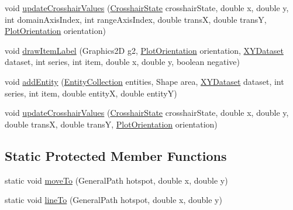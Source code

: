 \begin{DoxyCompactItemize}
void \mbox{\hyperlink{classorg_1_1jfree_1_1chart_1_1renderer_1_1xy_1_1_abstract_x_y_item_renderer_a65b65e46dadf26a12f00a7f634939ac9}{update\+Crosshair\+Values}} (\mbox{\hyperlink{classorg_1_1jfree_1_1chart_1_1plot_1_1_crosshair_state}{Crosshair\+State}} crosshair\+State, double x, double y, int domain\+Axis\+Index, int range\+Axis\+Index, double transX, double transY, \mbox{\hyperlink{classorg_1_1jfree_1_1chart_1_1plot_1_1_plot_orientation}{Plot\+Orientation}} orientation)
\item 
void \mbox{\hyperlink{classorg_1_1jfree_1_1chart_1_1renderer_1_1xy_1_1_abstract_x_y_item_renderer_a2c2307739d90675817597c71fdb2ef18}{draw\+Item\+Label}} (Graphics2D g2, \mbox{\hyperlink{classorg_1_1jfree_1_1chart_1_1plot_1_1_plot_orientation}{Plot\+Orientation}} orientation, \mbox{\hyperlink{interfaceorg_1_1jfree_1_1data_1_1xy_1_1_x_y_dataset}{X\+Y\+Dataset}} dataset, int series, int item, double x, double y, boolean negative)
\item 
void \mbox{\hyperlink{classorg_1_1jfree_1_1chart_1_1renderer_1_1xy_1_1_abstract_x_y_item_renderer_af2722e6d994c29c591b02b8400533e14}{add\+Entity}} (\mbox{\hyperlink{interfaceorg_1_1jfree_1_1chart_1_1entity_1_1_entity_collection}{Entity\+Collection}} entities, Shape area, \mbox{\hyperlink{interfaceorg_1_1jfree_1_1data_1_1xy_1_1_x_y_dataset}{X\+Y\+Dataset}} dataset, int series, int item, double entityX, double entityY)
\item 
void \mbox{\hyperlink{classorg_1_1jfree_1_1chart_1_1renderer_1_1xy_1_1_abstract_x_y_item_renderer_afbf70936cecbc4b753e3c93b941bd182}{update\+Crosshair\+Values}} (\mbox{\hyperlink{classorg_1_1jfree_1_1chart_1_1plot_1_1_crosshair_state}{Crosshair\+State}} crosshair\+State, double x, double y, double transX, double transY, \mbox{\hyperlink{classorg_1_1jfree_1_1chart_1_1plot_1_1_plot_orientation}{Plot\+Orientation}} orientation)
\end{DoxyCompactItemize}
\subsection*{Static Protected Member Functions}
\begin{DoxyCompactItemize}
\item 
static void \mbox{\hyperlink{classorg_1_1jfree_1_1chart_1_1renderer_1_1xy_1_1_abstract_x_y_item_renderer_a9710fa15edb6e02f6bc4830b4ca66d50}{move\+To}} (General\+Path hotspot, double x, double y)
\item 
static void \mbox{\hyperlink{classorg_1_1jfree_1_1chart_1_1renderer_1_1xy_1_1_abstract_x_y_item_renderer_a224252def6d33aca4c889e3e5e4fdcfe}{line\+To}} (General\+Path hotspot, double x, double y)
\end{DoxyCompactItemize}
